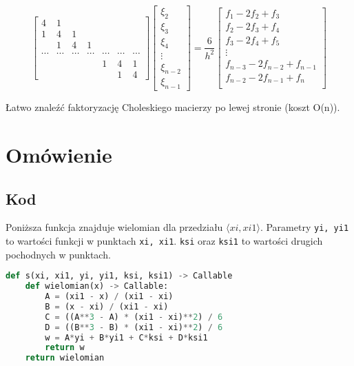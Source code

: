 \documentclass[a4paper,11pt]{article}
\begin{document}
\[
\begin{bmatrix}
    4 & 1 &   &     \\
    1 & 4 & 1 &     \\
      & 1 & 4 & 1   \\
    \cdots & \cdots & \cdots & \cdots & \cdots & \cdots & \cdots \\
    & & & & 1 & 4 & 1\\
    & & & & & 1 & 4
\end{bmatrix}
\begin{bmatrix}
    \xi_2 \\ \xi_3 \\ \xi_4 \\ \vdots \\ \xi_{n-2} \\ \xi_{n-1}
\end{bmatrix}
= \frac{6}{h^2}
\begin{bmatrix}
    f_1 - 2f_2 + f_3 \\
    f_2 - 2f_3 + f_4 \\
    f_3 - 2f_4 + f_5 \\
    \vdots \\
    f_{n-3} - 2f_{n-2} + f_{n-1} \\
    f_{n-2} - 2f_{n-1} + f_{n} \\
\end{bmatrix}
\]

Łatwo znaleźć faktoryzację Choleskiego macierzy po lewej stronie (koszt O(n)).

\section{Omówienie}

\subsection{Kod}

Poniższa funkcja znajduje wielomian dla przedziału \(\langle xi, xi1 \rangle \).
Parametry \texttt{yi, yi1} to wartości funkcji w punktach \texttt{xi, xi1}.
\texttt{ksi} oraz \texttt{ksi1} to wartości drugich pochodnych w punktach.
\begin{lstlisting}[caption={funkcja s}, language=Python]
def s(xi, xi1, yi, yi1, ksi, ksi1) -> Callable
    def wielomian(x) -> Callable:
        A = (xi1 - x) / (xi1 - xi)
        B = (x - xi) / (xi1 - xi)
        C = ((A**3 - A) * (xi1 - xi)**2) / 6
        D = ((B**3 - B) * (xi1 - xi)**2) / 6
        w = A*yi + B*yi1 + C*ksi + D*ksi1
        return w
    return wielomian
\end{lstlisting}
\end{document}
